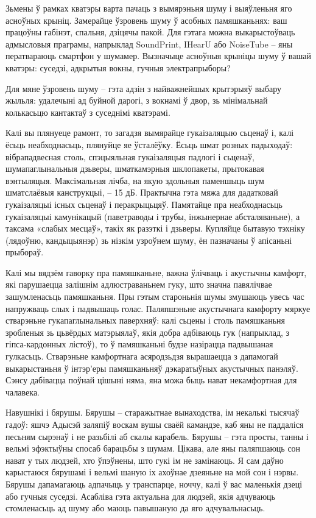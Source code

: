 Зьмены ў рамках кватэры варта пачаць з вымярэньня шуму і выяўленьня яго асноўных крыніц. Замерайце ўзровень шуму ў асобных памяшканьнях: ваш працоўны габінэт, спальня, дзіцячы пакой. Для гэтага можна выкарыстоўваць адмысловыя праграмы, напрыклад SoundPrint, IHearU або NoiseTube – яны ператвараюць смартфон у шумамер. Вызначыце асноўныя крыніцы шуму ў вашай кватэры: суседзі, адкрытыя вокны, гучныя электрапрыборы?

Для мяне ўзровень шуму – гэта адзін з найважнейшых крытэрыяў выбару жыльля: удалечыні ад буйной дарогі, з вокнамі ў двор, зь мінімальнай колькасьцю кантактаў з суседнімі кватэрамі.

Калі вы плянуеце рамонт, то загадзя вымярайце гукаізаляцыю сьценаў і, калі ёсьць неабходнасьць, плянуйце яе ўсталёўку. Ёсьць шмат розных падыходаў: вібрападвесная столь, спэцыяльная гукаізаляцыя падлогі і сьценаў, шумапаглынальныя дзьверы, шматкамэрныя шклопакеты, прытокавая вэнтыляцыя. Максімальная лічба, на якую здольныя паменшыць шум шматслаёвыя канструкцыі, – 15 дБ. Практычна гэта мяжа для дадатковай гукаізаляцыі існых сьценаў і перакрыцьцяў. Памятайце пра неабходнасьць гукаізаляцыі камунікацый (паветраводы і трубы, інжынернае абсталяваньне), а таксама «слабых месцаў», такіх як разэткі і дзьверы. Купляйце бытавую тэхніку (лядоўню, кандыцыянэр) зь нізкім узроўнем шуму, ён пазначаны ў апісаньні прыбораў.

Калі мы вядзём гаворку пра памяшканьне, важна ўлічваць і акустычны камфорт, які парушаецца залішнім адлюстраваньнем гуку, што значна павялічвае зашумленасьць памяшканьня. Пры гэтым староньнія шумы змушаюць увесь час напружваць слых і падвышаць голас. Паляпшэньне акустычнага камфорту мяркуе стварэньне гукапаглынальных паверхняў: калі сьцены і столь памяшканьня зробленыя зь цьвёрдых матэрыялаў, якія добра адбіваюць гук (напрыклад, з гіпса-кардонных лістоў), то ў памяшканьні будзе назірацца падвышаная гулкасьць. Стварэньне камфортнага асяродзьдзя вырашаецца з дапамогай выкарыстаньня ў інтэр'еры памяшканьняў дэкаратыўных акустычных панэляў. Сэнсу дабівацца поўнай цішыні няма, яна можа быць нават некамфортная для чалавека.

Навушнікі і бярушы. Бярушы – старажытнае вынаходства, ім некалькі тысячаў гадоў: яшчэ Адысэй заляпіў воскам вушы сваёй камандзе, каб яны не паддаліся песьням сырэнаў і не разьбілі аб скалы карабель. Бярушы – гэта просты, танны і вельмі эфэктыўны спосаб барацьбы з шумам. Цікава, але яны паляпшаюць сон нават у тых людзей, хто ўпэўнены, што гукі ім не замінаюць. Я сам даўно карыстаюся бярушамі і вельмі шаную іх ахоўнае дзеяньне на мой сон і нэрвы. Бярушы дапамагаюць адпачыць у транспарце, ноччу, калі ў вас маленькія дзеці або гучныя суседзі. Асабліва гэта актуальна для людзей, якія адчуваюць стомленасьць ад шуму або маюць павышаную да яго адчувальнасьць.

